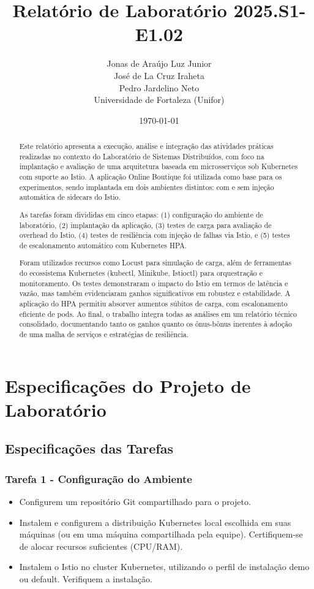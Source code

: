 \documentclass[12pt,a4paper]{report}
\title{Relatório de Laboratório 2025.S1-E1.02}
\author{
    Jonas de Araújo Luz Junior \\
    José de La Cruz Iraheta \\
    Pedro Jardelino Neto \\
    \small{Universidade de Fortaleza (Unifor)}
}
\date{\today}
\begin{document}
\maketitle
\tableofcontents
\clearpage


\begin{abstract} 
Este relatório apresenta a execução, análise e integração das atividades práticas realizadas no contexto do Laboratório de Sistemas Distribuídos, com foco na implantação e avaliação de uma arquitetura baseada em microsserviços sob Kubernetes com suporte ao Istio. A aplicação Online Boutique foi utilizada como base para os experimentos, sendo implantada em dois ambientes distintos: com e sem injeção automática de sidecars do Istio.

As tarefas foram divididas em cinco etapas: (1) configuração do ambiente de laboratório, (2) implantação da aplicação, (3) testes de carga para avaliação de overhead do Istio, (4) testes de resiliência com injeção de falhas via Istio, e (5) testes de escalonamento automático com Kubernetes HPA.

Foram utilizados recursos como Locust para simulação de carga, além de ferramentas do ecossistema Kubernetes (kubectl, Minikube, Istioctl) para orquestração e monitoramento. Os testes demonstraram o impacto do Istio em termos de latência e vazão, mas também evidenciaram ganhos significativos em robustez e estabilidade. A aplicação do HPA permitiu absorver aumentos súbitos de carga, com escalonamento eficiente de pods. Ao final, o trabalho integra todas as análises em um relatório técnico consolidado, documentando tanto os ganhos quanto os ônus-bônus inerentes à adoção de uma malha de serviços e estratégias de resiliência.
\end{abstract}

\chapter{Especificações do Projeto de Laboratório}

\section{Especificações das Tarefas}
\subsection{Tarefa 1 - Configuração do Ambiente}
\begin{itemize}
    \item Configurem um repositório Git compartilhado para o projeto.
    \item Instalem e configurem a distribuição Kubernetes local escolhida em suas máquinas (ou em uma máquina compartilhada pela equipe). Certifiquem-se de alocar recursos suficientes (CPU/RAM).
    \item Instalem o Istio no cluster Kubernetes, utilizando o perfil de instalação demo ou default. Verifiquem a instalação.
\end{itemize}
\end{document}

